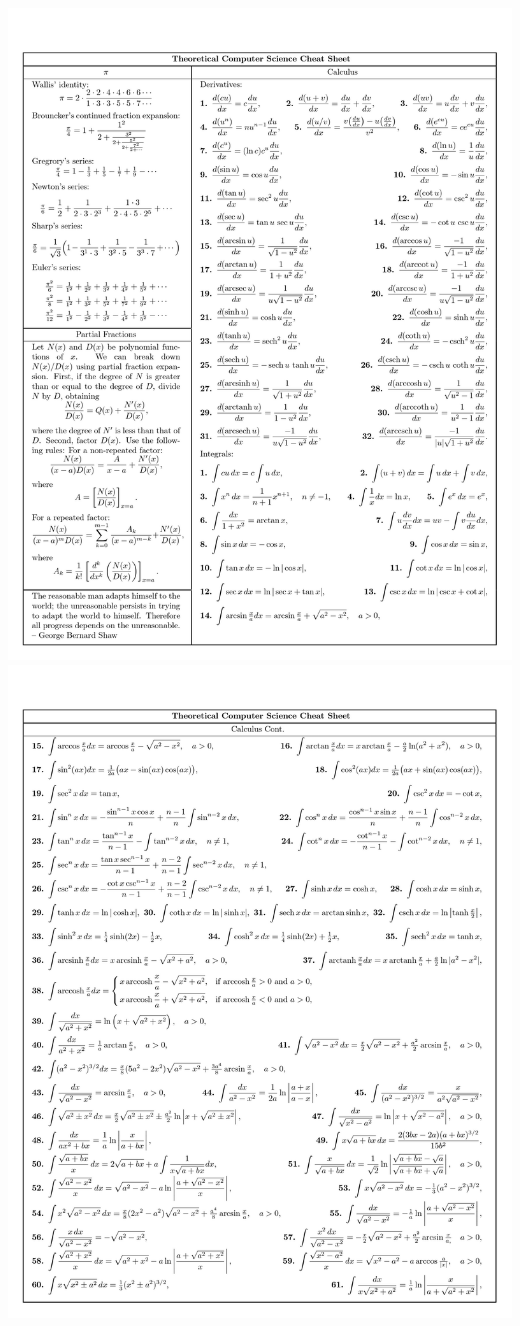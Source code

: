 \documentclass{article}
\begin{document}
\newpage
\includegraphics[trim = 6mm 2mm 0mm 10mm,clip=true,scale = 0.73]{./images/image-0006.jpg}
\newpage
\includegraphics[trim = 6mm 2mm 0mm 10mm,clip=true,scale = 0.73]{./images/image-0007.jpg}
\end{document}
